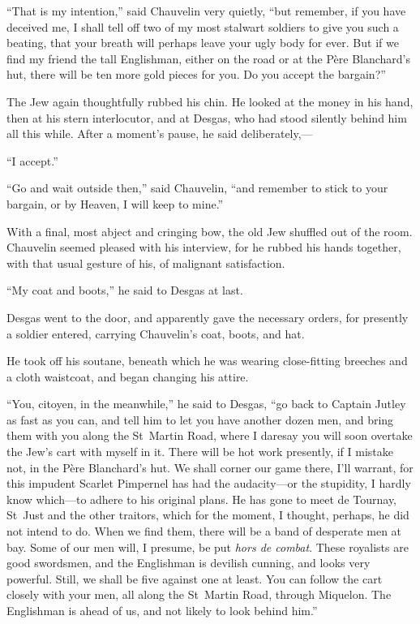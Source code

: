 \enquote{That is my intention,} said Chauvelin very quietly, \enquote{but remember, if you have deceived me, I shall tell off two of my most stalwart soldiers to give you such a beating, that your breath will perhaps leave your ugly body for ever. But if we find my friend the tall Englishman, either on the road or at the Père Blanchard's hut, there will be ten more gold pieces for you. Do you accept the bargain?}

The Jew again thoughtfully rubbed his chin. He looked at the money in his hand, then at his stern interlocutor, and at Desgas, who had stood silently behind him all this while. After a moment's pause, he said deliberately,---

\enquote{I accept.}

\enquote{Go and wait outside then,} said Chauvelin, \enquote{and remember to stick to your bargain, or by Heaven, I will keep to mine.}

With a final, most abject and cringing bow, the old Jew shuffled out of the room. Chauvelin seemed pleased with his interview, for he rubbed his hands together, with that usual gesture of his, of malignant satisfaction.

\enquote{My coat and boots,} he said to Desgas at last.

Desgas went to the door, and apparently gave the necessary orders, for presently a soldier entered, carrying Chauvelin's coat, boots, and hat.

He took off his soutane, beneath which he was wearing close-fitting breeches and a cloth waistcoat, and began changing his attire.

\enquote{You, citoyen, in the meanwhile,} he said to Desgas, \enquote{go back to Captain Jutley as fast as you can, and tell him to let you have another dozen men, and bring them with you along the St~Martin Road, where I daresay you will soon overtake the Jew's cart with myself in it. There will be hot work presently, if I mistake not, in the Père Blanchard's hut. We shall corner our game there, I'll warrant, for this impudent Scarlet Pimpernel has had the audacity---or the stupidity, I hardly know which---to adhere to his original plans. He has gone to meet de Tournay, St~Just and the other traitors, which for the moment, I thought, perhaps, he did not intend to do. When we find them, there will be a band of desperate men at bay. Some of our men will, I presume, be put \textit{hors de combat}. These royalists are good swordsmen, and the Englishman is devilish cunning, and looks very powerful. Still, we shall be five against one at least. You can follow the cart closely with your men, all along the St~Martin Road, through Miquelon. The Englishman is ahead of us, and not likely to look behind him.}

